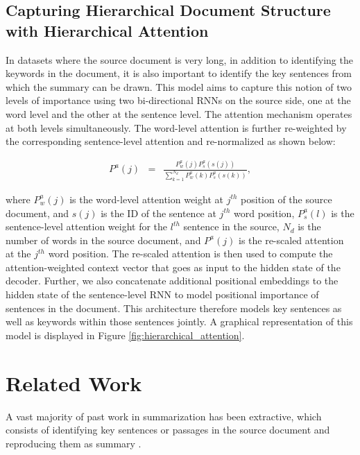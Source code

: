 \subsection{Capturing Hierarchical Document Structure with Hierarchical Attention}\label{sec:hierarchical}
In datasets where the source document is very long, in addition to identifying the keywords in the document, it is also important to identify the key sentences from which the summary can be drawn. This model aims to capture this notion of two levels of importance using two bi-directional RNNs on the source side, one at the word level and the other at the sentence level. The attention mechanism operates at both levels simultaneously. The word-level attention is further re-weighted by the corresponding sentence-level attention and re-normalized as shown below:

\begin{eqnarray}
P^a(j) &=&  \frac{P^a_w(j)P^a_s(s(j))}{\sum_{k=1}^{N_d} P^a_w(k)P^a_s(s(k))},\nonumber
\end{eqnarray}

where $P^a_w(j)$ is the word-level attention weight at $j^{th}$ position of the source document, and $s(j)$ is the ID of the sentence at $j^{th}$ word position, $P^a_s(l)$ is the sentence-level attention weight for the $l^{th}$ sentence in the source, $N_d$ is the number of words in the source document, and $P^a(j)$ is the re-scaled attention at the  $j^{th}$ word position. The re-scaled attention is then used to compute the attention-weighted context vector that goes as input to the hidden state of the decoder. Further, we also concatenate additional positional embeddings to the hidden state of the sentence-level RNN to model positional importance of sentences in the document. This architecture therefore models key sentences as well as keywords within those sentences jointly. A graphical representation of this model is displayed in Figure \ref{fig:hierarchical_attention}. 

\section{Related Work}\label{sec:related_work}

A vast majority of past work in summarization has been extractive, which consists of identifying key sentences or passages in the source document and reproducing them as summary \cite{neto:2002:ATS,extractive,wong:2008:ESU,filippovaA13:EMNLP,colmenares:NAACL2015,graph_based,key_phrases,key_passages}.

